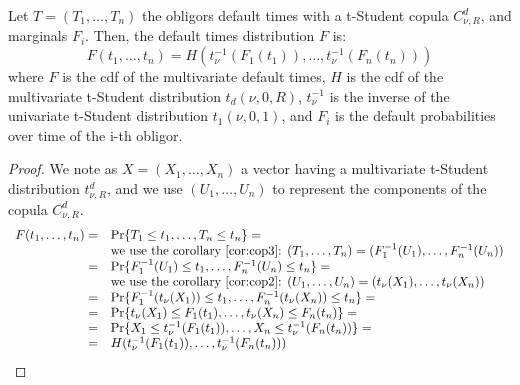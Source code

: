 \documentclass[11pt,fleqn]{book} %
\begin{document}
\begin{proposition}
	\label{prop:dtd}
	Let $T=(T_1,\dots,T_n)$ the obligors default times with a t-Student copula 
	$C_{\nu,R}^d$, and marginals $F_i$. 
	Then, the default times distribution $F$ is:
	\begin{displaymath}
		F(t_1,\dots,t_n) = H\left(t_\nu^{-1}(F_1(t_1)), \dots, t_\nu^{-1}(F_n(t_n))\right)
	\end{displaymath}
	where $F$ is the cdf of the multivariate default times, $H$ is the cdf of 
	the multivariate t-Student distribution $t_d(\nu,0,R)$, $t_\nu^{-1}$ is the 
	inverse of the univariate t-Student distribution $t_1(\nu,0,1)$, and $F_i$ 
	is the default probabilities over time of the i-th obligor.
\end{proposition}
\begin{proof}
	We note as $X=(X_1,\dots,X_n)$ a vector having a multivariate t-Student
	distribution $t_{\nu,R}^d$, and we use $(U_1,\dots,U_n)$ to represent
	the components of the copula $C_{\nu,R}^d$.
	\begin{displaymath}
		\begin{array}{rl}
			F(t_1,\dots,t_n) = & \Pr\{ T_1 \le t_1 , \dots, T_n \le t_n \} =                                    \\
			                   & \text{we use the corollary \ref{cor:cop3}: }                                   
			(T_1,\dots,T_n) = (F_1^{-1}(U_1),\dots,F_n^{-1}(U_n)) \\
			=                  & \Pr\{ F_1^{-1}(U_1) \le t_1 , \dots , F_n^{-1}(U_n) \le t_n \} =               \\
			                   & \text{we use the corollary \ref{cor:cop2}: }                                   
			(U_1,\dots,U_n) = (t_\nu(X_1),\dots,t_\nu(X_n)) \\
			=                  & \Pr\{ F_1^{-1}(t_\nu(X_1)) \le t_1 , \dots , F_n^{-1}(t_\nu(X_n)) \le t_n \} = \\
			=                  & \Pr\{ t_\nu(X_1) \le F_1(t_1) , \dots , t_\nu(X_n) \le F_n(t_n) \} =           \\
			=                  & \Pr\{ X_1 \le t_\nu^{-1}(F_1(t_1)) , \dots , X_n \le t_\nu^{-1}(F_n(t_n)) \} = \\
			=                  & H(t_\nu^{-1}(F_1(t_1)), \dots, t_\nu^{-1}(F_n(t_n)))                           \\
		\end{array}
	\end{displaymath}
\end{proof}
\end{document}
